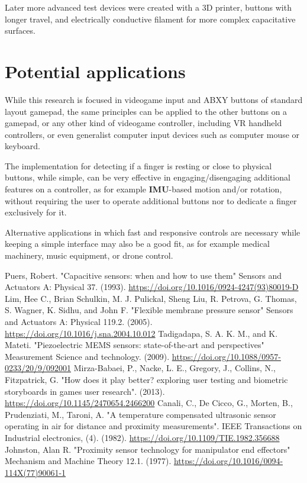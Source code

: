 \documentclass[10pt, twocolumn, a4paper]{article}
\begin{document}
    Later more advanced test devices were created with a 3D printer, buttons with longer travel, and electrically conductive filament for more complex capacitative surfaces.

\pagebreak
\section{Potential applications}
    While this research is focused in videogame input and ABXY buttons of standard layout gamepad, the same principles can be applied to the other buttons on a gamepad, or any other kind of videogame controller, including VR handheld controllers, or even generalist computer input devices such as computer mouse or keyboard.

    The implementation for detecting if a finger is resting or close to physical buttons, while simple, can be very effective in engaging/disengaging additional features on a controller, as for example \textbf{IMU}-based motion and/or rotation, without requiring the user to operate additional buttons nor to dedicate a finger exclusively for it.

    Alternative applications in which fast and responsive controls are necessary while keeping a simple interface may also be a good fit, as for example medical machinery, music equipment, or drone control.

\begin{thebibliography}{99}
        Puers, Robert.
        "Capacitive sensors: when and how to use them"
        Sensors and Actuators A: Physical 37.
        (1993).
        \url{https://doi.org/10.1016/0924-4247(93)80019-D}
        Lim, Hee C., Brian Schulkin, M. J. Pulickal, Sheng Liu, R. Petrova, G. Thomas, S. Wagner, K. Sidhu, and John F.
        "Flexible membrane pressure sensor"
        Sensors and Actuators A: Physical 119.2.
        (2005).
        \url{https://doi.org/10.1016/j.sna.2004.10.012}
        Tadigadapa, S. A. K. M., and K. Mateti.
        "Piezoelectric MEMS sensors: state-of-the-art and perspectives"
        Measurement Science and technology.
        (2009).
        \url{https://doi.org/10.1088/0957-0233/20/9/092001}
        Mirza-Babaei, P., Nacke, L. E., Gregory, J., Collins, N., Fitzpatrick, G.
        "How does it play better? exploring user testing and biometric storyboards in games user research".
        (2013).
        \url{https://doi.org/10.1145/2470654.2466200}
        Canali, C., De Cicco, G., Morten, B., Prudenziati, M., Taroni, A.
        "A temperature compensated ultrasonic sensor operating in air for distance and proximity measurements".
        IEEE Transactions on Industrial electronics, (4).
        (1982).
        \url{https://doi.org/10.1109/TIE.1982.356688}
        Johnston, Alan R.
        "Proximity sensor technology for manipulator end effectors"
        Mechanism and Machine Theory 12.1.
        (1977).
        \url{https://doi.org/10.1016/0094-114X(77)90061-1}
\end{thebibliography}

\end{document}
